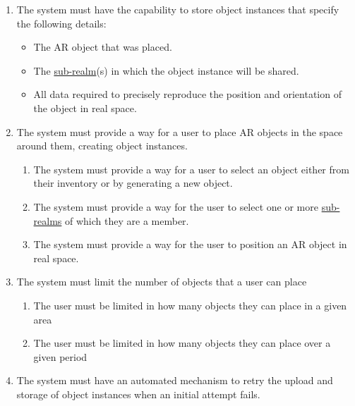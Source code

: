 \documentclass{article}
\begin{document}
\begin{enumerate}[align=left, label=\textbf{OP-FR\arabic*:}]
    \item The system must have the capability to store object instances that specify the following details:
          \begin{itemize}
              \item The AR object that was placed.
              \item The \hyperref[def:sub_realm]{sub-realm}(s) in which the object instance will be shared.
              \item All data required to precisely reproduce the position and orientation of the object in real space.
          \end{itemize}

    \item The system must provide a way for a user to place AR objects in the space around them, creating object instances.
          \begin{enumerate}[align=left, label=\textbf{OP-FR2.\arabic*:}]
              \item The system must provide a way for a user to select an object either from their inventory or by generating a new object.
              \item The system must provide a way for the user to select one or more \hyperref[def:sub_realm]{sub-realms} of which they are a member.
              \item The system must provide a way for the user to position an AR object in real space.
          \end{enumerate}

    \item The system must limit the number of objects that a user can place
          \begin{enumerate}[align=left, label=\textbf{OP-FR3.\arabic*:}]
              \item The user must be limited in how many objects they can place in a given area
              \item The user must be limited in how many objects they can place over a given period
          \end{enumerate}

    \item The system must have an automated mechanism to retry the upload and storage of object instances when an initial attempt fails. \\
\end{enumerate}
\end{document}
